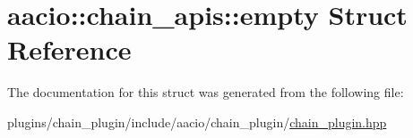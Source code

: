 \hypertarget{structaacio_1_1chain__apis_1_1empty}{}\section{aacio\+:\+:chain\+\_\+apis\+:\+:empty Struct Reference}
\label{structaacio_1_1chain__apis_1_1empty}


The documentation for this struct was generated from the following file\+:\begin{DoxyCompactItemize}
\item 
plugins/chain\+\_\+plugin/include/aacio/chain\+\_\+plugin/\mbox{\hyperlink{chain__plugin_8hpp}{chain\+\_\+plugin.\+hpp}}\end{DoxyCompactItemize}
